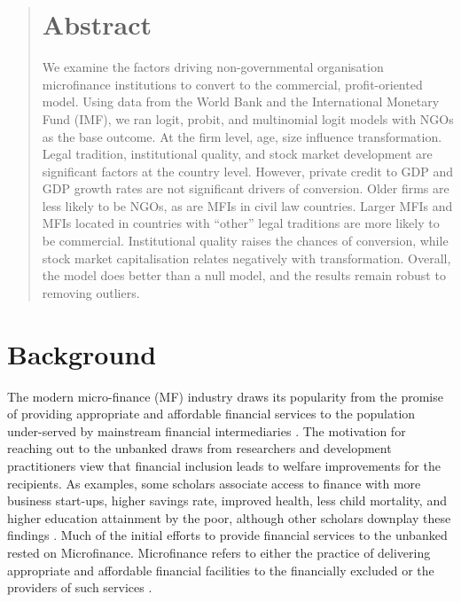 \documentclass[a4paper, nobind]{templates/ociamthesis}
\begin{document}
\begin{quote}
\hypertarget{abstract}{%
\section{\texorpdfstring{\textbf{Abstract}}{Abstract}}\label{abstract}}

We examine the factors driving non-governmental organisation microfinance institutions to convert to the commercial, profit-oriented model. Using data from the World Bank and the International Monetary Fund (IMF), we ran logit, probit, and multinomial logit models with NGOs as the base outcome. At the firm level, age, size influence transformation. Legal tradition, institutional quality, and stock market development are significant factors at the country level. However, private credit to GDP and GDP growth rates are not significant drivers of conversion. Older firms are less likely to be NGOs, as are MFIs in civil law countries. Larger MFIs and MFIs located in countries with ``other'' legal traditions are more likely to be commercial. Institutional quality raises the chances of conversion, while stock market capitalisation relates negatively with transformation. Overall, the model does better than a null model, and the results remain robust to removing outliers.
\end{quote}

\hypertarget{background}{%
\section{\texorpdfstring{\textbf{Background}}{Background}}\label{background}}

The modern micro-finance (MF) industry draws its popularity from the promise of providing appropriate and affordable financial services to the population under-served by mainstream financial intermediaries \autocite{morduch1999microfinance,morduch2000microfinance}. The motivation for reaching out to the unbanked draws from researchers and development practitioners view that financial inclusion leads to welfare improvements for the recipients. As examples, some scholars associate access to finance with more business start-ups, higher savings rate, improved health, less child mortality, and higher education attainment by the poor, although other scholars downplay these findings \autocite{klapper2015role,o2017systematic,shahriar2017lender}. Much of the initial efforts to provide financial services to the unbanked rested on Microfinance. Microfinance refers to either the practice of delivering appropriate and affordable financial facilities to the financially excluded or the providers of such services \autocite{ledgerwood2006transforming}.
\end{document}
